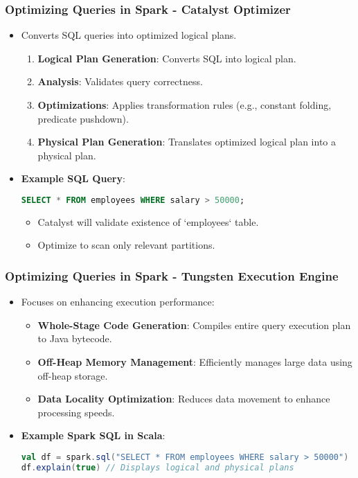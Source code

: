 \documentclass[aspectratio=169]{beamer}
\begin{document}
\begin{frame}[fragile]
    \frametitle{Optimizing Queries in Spark - Catalyst Optimizer}
    \begin{itemize}
        \item Converts SQL queries into optimized logical plans.
        \begin{enumerate}
            \item \textbf{Logical Plan Generation}: Converts SQL into logical plan.
            \item \textbf{Analysis}: Validates query correctness.
            \item \textbf{Optimizations}: Applies transformation rules (e.g., constant folding, predicate pushdown).
            \item \textbf{Physical Plan Generation}: Translates optimized logical plan into a physical plan.
        \end{enumerate}
        \item \textbf{Example SQL Query}:
        \begin{lstlisting}[language=SQL]
SELECT * FROM employees WHERE salary > 50000;
        \end{lstlisting}
        \begin{itemize}
            \item Catalyst will validate existence of `employees` table.
            \item Optimize to scan only relevant partitions.
        \end{itemize}
    \end{itemize}
\end{frame}

\begin{frame}[fragile]
    \frametitle{Optimizing Queries in Spark - Tungsten Execution Engine}
    \begin{itemize}
        \item Focuses on enhancing execution performance:
        \begin{itemize}
            \item \textbf{Whole-Stage Code Generation}: Compiles entire query execution plan to Java bytecode.
            \item \textbf{Off-Heap Memory Management}: Efficiently manages large data using off-heap storage.
            \item \textbf{Data Locality Optimization}: Reduces data movement to enhance processing speeds.
        \end{itemize}
        \item \textbf{Example Spark SQL in Scala}:
        \begin{lstlisting}[language=Scala]
val df = spark.sql("SELECT * FROM employees WHERE salary > 50000")
df.explain(true) // Displays logical and physical plans
        \end{lstlisting}
    \end{itemize}
\end{frame}
\end{document}
